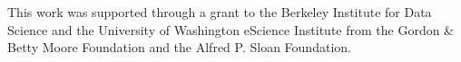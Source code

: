 



\begin{acks}

This work was supported through a grant to the Berkeley Institute for Data
Science and the University of Washington eScience Institute from the Gordon \&
Betty Moore Foundation and the Alfred P. Sloan Foundation.

\end{acks}
